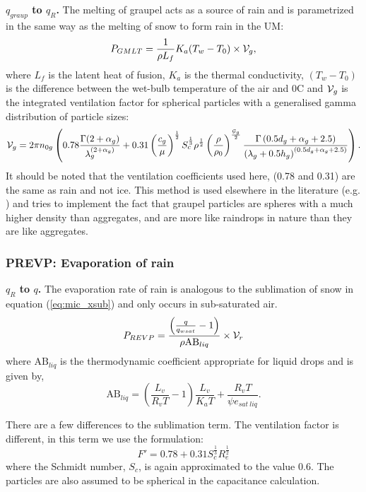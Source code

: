 \documentclass{UMDP_article}
\def\bq{\begin{equation}}
\def\eq{\end{equation}}
\begin{document}
\textbf{$q_{graup}$ to $q_{R}$.}
The melting of graupel acts as a source of rain and is parametrized in the same 
way as the melting of snow to form rain in the UM:
\bq
 P_{GMLT} =
\frac{1}{\rho L_f} K_a(T_w-T_0) \times{\cal V}_g ,
\eq
where $L_f$ is the latent heat of fusion, $K_a$ is the thermal conductivity,  
$(T_w-T_0)$ is the difference between the wet-bulb temperature of the air 
and 0\textdegree C and ${\cal V}_g$ is the integrated ventilation factor for 
spherical particles with a generalised gamma distribution of particle sizes:
\bq
  {{\cal V}_g}=2\pi n_{0g}
          \left(0.78\frac{\Gamma(2+\alpha_g)}{\lambda_g^{(2+\alpha_g)}}
                       +0.31\left(\frac{c_g}{\mu}\right)^{\frac{1}{2}}
                                                          S_c^{\frac{1}{3}}
         \rho^{\frac{1}{2}}\left(\frac{\rho}{\rho_0}\right)^{\frac{\mathcal{G}_g}{2}}
        \frac{\Gamma\left(0.5d_g+\alpha_g+2.5\right)}
 {\left(\lambda_g+0.5h_g\right)^{(0.5d_g+\alpha_g+2.5)}}
          \right).
\label{eq:mic_ventx_g}
\eq 
It should be noted that the ventilation coefficients used here, (0.78 and 0.31)
are the same as rain and not ice. This method is used elsewhere in the literature 
(e.g. \citealp{Reisner:etal:1998} ) and tries to implement the fact that graupel
particles are spheres with a much higher density than aggregates, and are more
like raindrops in nature than they are like aggregates. 

\subsubsection{PREVP:  Evaporation of rain}
\label{sec:PREVP}

\textbf{$q_{R}$ to $q$.}
The evaporation rate of rain is analogous to the sublimation of snow in
equation (\ref{eq:mic_xsub}) and only occurs in sub-saturated air.
\bq
 P_{REVP}=
     \frac{ \left(\frac{q}{q_{wsat}}-1\right)} {\rho \mbox{AB}_{liq}}
\times {{\cal V}_r}
\eq
where $\mbox{AB}_{liq}$ is the thermodynamic coefficient appropriate for
liquid drops and is given by,
\bq
\mbox{AB}_{liq}=   \left(  \frac{L_v}{R_v T} -1 \right) 
\frac{L_v}{K_a T} + \frac{R_v T}{\psi e_{sat~liq}}.
\label{eq:mic_ABliq}
\eq

There are a few differences to the sublimation term.
The ventilation factor is different, in this term
we use the \cite{Beard:Pruppacher:1971} formulation:
\bq
F'=0.78+0.31S_c^{\frac{1}{3}} R_e^\frac{1}{2}
\eq
where the Schmidt number, $S_c$, is again approximated to the value 0.6. 
The particles are also assumed to be spherical in the capacitance
calculation.
\end{document}
